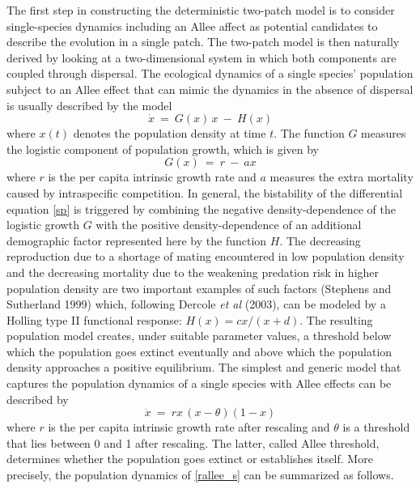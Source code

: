 \indent The first step in constructing the deterministic two-patch model is to consider single-species dynamics including
 an Allee affect as potential candidates to describe the evolution in a single patch.
 The two-patch model is then naturally derived by looking at a two-dimensional system in which both components are coupled
 through dispersal.
 The ecological dynamics of a single species' population subject to an Allee effect that can mimic the dynamics in the
 absence of dispersal is usually described by the model
\begin{equation}
\label{sp}
 \dot{x} \ = \ G (x) \,x \ - \ H (x)
\end{equation}
 where $x(t)$ denotes the population density at time $t$.
 The function $G$ measures the logistic component of population growth, which is given by
\begin{equation}
\label{g}
 G (x) \ = \ r \ - \ ax
\end{equation}
 where $r$ is the per capita intrinsic growth rate and $a$ measures the extra mortality caused by intraspecific competition.
 In general, the bistability of the differential equation \eqref{sp} is triggered by combining the negative density-dependence of the
 logistic growth $G$ with the positive density-dependence of an additional demographic factor represented here by the function $H$.
 The decreasing reproduction due to a shortage of mating encountered in low population density and the decreasing mortality due
 to the weakening predation risk in higher population density are two important examples of such factors (Stephens and Sutherland 1999)
 which, following Dercole \emph{et al} (2003), can be modeled by a Holling type II functional response: $H (x) = c x / (x + d)$.
 The resulting population model creates, under suitable parameter values, a threshold below which the population goes extinct
 eventually and above which the population density approaches a positive equilibrium.
 The simplest and generic model that captures the population dynamics of a single species with Allee effects can be described by
\begin{equation}
\label{rallee_s}
 \dot{x} \ = \ r x \,(x - \theta) (1 - x)
\end{equation}
 where $r$ is the per capita intrinsic growth rate after rescaling and $\theta$ is a threshold that lies between 0 and 1 after
 rescaling.
 The latter, called Allee threshold, determines whether the population goes extinct or establishes itself.
 More precisely, the population dynamics of \eqref{rallee_s} can be summarized as follows.
